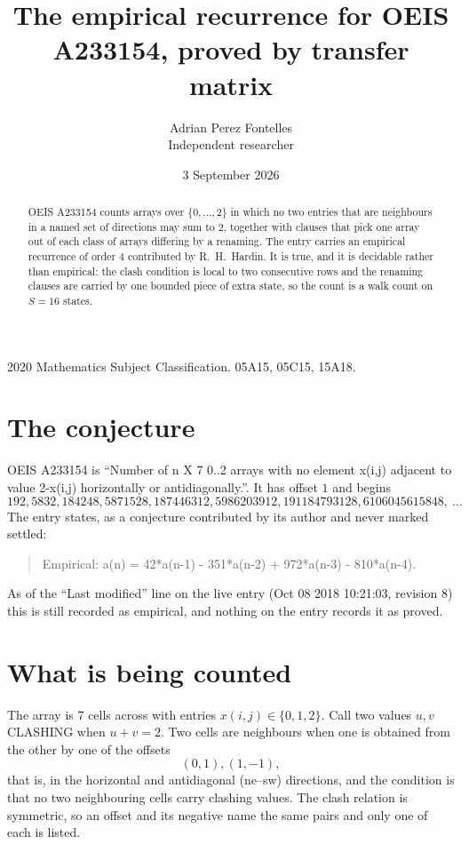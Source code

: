 \documentclass[11pt,a4paper]{article}
\title{The empirical recurrence for OEIS A233154, proved by transfer matrix}
\author{Adrian Perez Fontelles\\ \small Independent researcher}
\date{3 September 2026}
\theoremstyle{plain}
\theoremstyle{definition}
\begin{document}
\maketitle

\begin{abstract}
OEIS A233154 counts arrays over $\{0,\dots,2\}$ in which no two entries that are neighbours in
a named set of directions may sum to $2$, together with clauses that pick one array out of
each class of arrays differing by a renaming. The entry carries an empirical recurrence of
order $4$ contributed by R.~H.~Hardin. It is true, and it is decidable rather than
empirical: the clash condition is local to two consecutive rows and the renaming clauses are
carried by one bounded piece of extra state, so the count is a walk count on $S=16$ states.
\end{abstract}

\noindent\small 2020 Mathematics Subject Classification. 05A15, 05C15, 15A18.\normalsize

\section{The conjecture}

OEIS A233154 is ``Number of n X 7 0..2 arrays with no element x(i,j) adjacent to value 2-x(i,j) horizontally or antidiagonally.''. It has offset $1$ and begins
\[
192, 5832, 184248, 5871528, 187446312, 5986203912, 191184793128, 6106045615848,\ \dots
\]
The entry states, as a conjecture contributed by its author and never marked settled:
\begin{quote}
Empirical: a(n) = 42*a(n-1) - 351*a(n-2) + 972*a(n-3) - 810*a(n-4).
\end{quote}
As of the ``Last modified'' line on the live entry (Oct 08 2018 10:21:03, revision 8) this is still
recorded as empirical, and nothing on the entry records it as proved.

\section{What is being counted}

The array is $7$ cells across with entries $x(i,j)\in\{0,1,2\}$. Call two values $u,v$ CLASHING
when $u+v=2$. Two cells are neighbours when one is obtained from the other by one of
the offsets
\[
(0,1), (1,-1),
\]
that is, in the horizontal and antidiagonal (ne--sw) directions, and the condition is that no two neighbouring cells carry
clashing values. The clash relation is symmetric, so an offset and its negative name the
same pairs and only one of each is listed.
\end{document}
